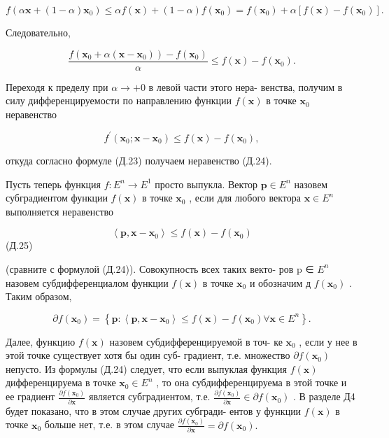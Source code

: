 \documentclass[8pt]{extarticle}
\begin{document}
\[
f\left( {\alpha \mathbf{x} + \left( {1 - \alpha }\right) {\mathbf{x}}_{0}}\right)  \leq  {\alpha f}\left( \mathbf{x}\right)  + \left( {1 - \alpha }\right) f\left( {\mathbf{x}}_{0}\right)  = f\left( {\mathbf{x}}_{0}\right)  + \alpha \left\lbrack  {f\left( \mathbf{x}\right)  - f\left( {\mathbf{x}}_{0}\right) }\right\rbrack  .
\]

Следовательно,

\[
\frac{f\left( {{\mathbf{x}}_{0} + \alpha \left( {\mathbf{x} - {\mathbf{x}}_{0}}\right) }\right)  - f\left( {\mathbf{x}}_{0}\right) }{\alpha } \leq  f\left( \mathbf{x}\right)  - f\left( {\mathbf{x}}_{0}\right) .
\]

Переходя к пределу при \(\alpha  \rightarrow   + 0\) в левой части этого нера- венства, получим в силу дифференцируемости по направлению функции \(f\left( \mathbf{x}\right)\) в точке \({\mathbf{x}}_{0}\) неравенство

\[
{f}^{\prime }\left( {{\mathbf{x}}_{0};\mathbf{x} - {\mathbf{x}}_{0}}\right)  \leq  f\left( \mathbf{x}\right)  - f\left( {\mathbf{x}}_{0}\right) ,
\]

откуда согласно формуле (Д.23) получаем неравенство (Д.24).

Пусть теперь функция \(f : {E}^{n} \rightarrow  {E}^{1}\) просто выпукла. Вектор \(\mathbf{p} \in  {E}^{n}\) назовем субградиентом функции \(f\left( \mathbf{x}\right)\) в точке \({\mathbf{x}}_{0}\) , если для любого вектора \(\mathbf{x} \in  {E}^{n}\) выполняется неравенство

\[
\left\langle  {\mathbf{p},\mathbf{x} - {\mathbf{x}}_{0}}\right\rangle   \leq  f\left( \mathbf{x}\right)  - f\left( {\mathbf{x}}_{0}\right)
\]
 (Д.25)

(сравните с формулой (Д.24)). Совокупность всех таких векто- ров p ∈ \({E}^{n}\) назовем субдифференциалом функции \(f\left( \mathbf{x}\right)\) в точке \({\mathbf{x}}_{0}\) и обозначим д \(f\left( {\mathbf{x}}_{0}\right)\) . Таким образом,

\[
\partial f\left( {\mathbf{x}}_{0}\right)  = \left\{  {\mathbf{p} : \left\langle  {\mathbf{p},\mathbf{x} - {\mathbf{x}}_{0}}\right\rangle   \leq  f\left( \mathbf{x}\right)  - f\left( {\mathbf{x}}_{0}\right) \forall \mathbf{x} \in  {E}^{n}}\right\}  .
\]

Далее, функцию \(f\left( \mathbf{x}\right)\) назовем субдифференцируемой в точ- ке \({\mathbf{x}}_{0}\) , если у нее в этой точке существует хотя бы один суб- градиент, т.е. множество \(\partial f\left( {\mathbf{x}}_{0}\right)\) непусто. Из формулы (Д.24) следует, что если выпуклая функция \(f\left( \mathbf{x}\right)\) дифференцируема в точке \({\mathbf{x}}_{0} \in  {E}^{n}\) , то она субдифференцируема в этой точке и ее градиент \(\frac{\partial f\left( {\mathbf{x}}_{0}\right) }{\partial \mathbf{x}}\) является субградиентом, т.е. \(\frac{\partial f\left( {\mathbf{x}}_{0}\right) }{\partial \mathbf{x}} \in  \partial f\left( {\mathbf{x}}_{0}\right)\) . В разделе Д4 будет показано, что в этом случае других субгради- ентов у функции \(f\left( \mathbf{x}\right)\) в точке \({\mathbf{x}}_{0}\) больше нет, т.е. в этом случае \(\frac{\partial f\left( {\mathbf{x}}_{0}\right) }{\partial \mathbf{x}} = \partial f\left( {\mathbf{x}}_{0}\right) .\)
\end{document}
